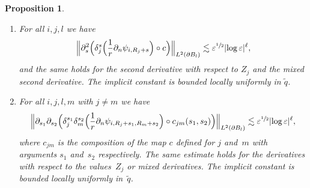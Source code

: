 \documentclass[10pt]{amsart}
\let\epsilon\varepsilon
\newtheorem{proposition}[theorem]{Proposition}
\theoremstyle{definition}
\newcommand\Bnorm[1]{\Bigl\lVert #1\Bigr\rVert}
\let\de\partial
\let\eps\epsilon
\begin{document}
\skpt
\begin{proposition}\label{2nd deri mu}
\begin{enumerate}
\item\label{2nd deri mua}
For all $i,j,l$ we have
\begin{align*}
\Bnorm{\de_s^2\Bigl(\delta_j^s \Bigl(\frac{1}{r}\de_n\psi_{i,R_j+s} \Bigr)\circ c \Bigr)}_{L^2(\de B_l)}\lesssim \eps^{\sfrac{1}{2}}|{\log\eps}|^\ell,
\end{align*}
and the same holds for the second derivative with respect to $Z_j$ and the mixed second derivative. The implicit constant is bounded locally uniformly in $\tilde{q}$.
\item\label{2nd deri mub}
For all $i,j,l,m$ with $j\neq m$ we have
\begin{align*}
\Bnorm{\de_{s_1}\de_{s_2} \Bigl(\delta_j^{s_1}\delta_m^{s_2} \Bigl(\frac{1}{r}\de_n\psi_{i,R_j+s_1,R_m+s_2} \Bigr)\circ c_{jm}(s_1,s_2) \Bigr)}_{L^2(\de B_l)}\lesssim \eps^{\sfrac{1}{2}}|{\log\eps}|^\ell,
\end{align*}
where $c_{jm}$ is the composition of the map $c$ defined for $j$ and~$m$ with arguments $s_1$ and~$s_2$ respectively. The same estimate holds for the derivatives with respect to the values~$Z_j$ or mixed derivatives. The implicit constant is bounded locally uniformly in~$\tilde{q}$.
\end{enumerate}
\end{proposition}
\end{document}
